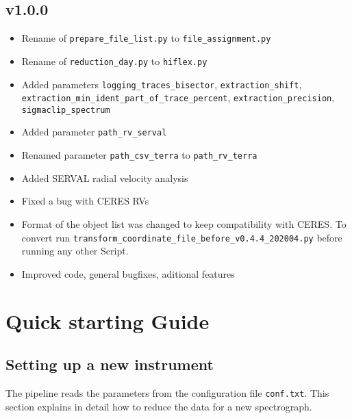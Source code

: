\documentclass[10pt,a4paper]{article}
\begin{document}
\subsection*{v1.0.0}
\begin{itemize}\setlength\itemsep{0em}
  \item Rename of \verb|prepare_file_list.py| to \verb|file_assignment.py|
  \item Rename of \verb|reduction_day.py| to \verb|hiflex.py|
  \item Added parameters \verb|logging_traces_bisector|, \verb|extraction_shift|, \verb|extraction_min_ident_part_of_trace_percent|, \verb|extraction_precision|, \verb|sigmaclip_spectrum|
  \item Added parameter \verb|path_rv_serval|
  \item Renamed parameter \verb|path_csv_terra| to \verb|path_rv_terra|
  \item Added SERVAL radial velocity analysis
  \item Fixed a bug with CERES RVs
  \item Format of the object list was changed to keep compatibility with CERES. To convert run \verb|transform_coordinate_file_before_v0.4.4_202004.py| before running any other Script. %
  \item Improved code, general bugfixes, aditional features
\end{itemize}

\section{Quick starting Guide}

\subsection{Setting up a new instrument}
\label{Section:first_configuration}
The pipeline reads the parameters from the configuration file \verb|conf.txt|. This section explains in detail how to reduce the data for a new spectrograph.
\end{document}
